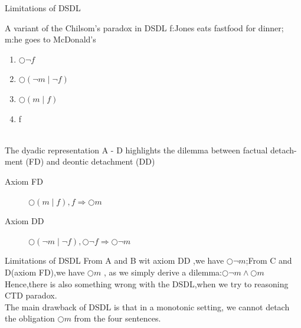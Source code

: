 \documentclass{beamer}
\begin{document}
\begin{frame}{Limitations of DSDL}
\begin{block}{A variant of the Chilsom's paradox in DSDL}
f:Jones eats fastfood for dinner; m:he goes to McDonald’s 
\begin{enumerate}
\item[A]$\bigcirc \neg f$
\item[B]$\bigcirc(\neg m \mid \neg f)$
\item[C]$\bigcirc(m\mid f)$
\item[D]f
\end{enumerate}
\end{block}
\\
The dyadic representation A - D highlights the dilemma between factual detach-ment (FD) and deontic detachment (DD)
\begin{description}
\item[Axiom FD]$\bigcirc(m\mid f),f \Rightarrow \bigcirc m$\\
\item[Axiom DD]$\bigcirc(\neg m \mid \neg f), \bigcirc\neg f \Rightarrow \bigcirc\neg m$\\
\end{description}
\end{frame}
\begin{frame}{Limitations of DSDL}
From A and B wit axiom DD ,we have $\bigcirc\neg  m$;From C and D(axiom FD),we have $\bigcirc m$ , as we simply derive a dilemma:$\bigcirc\neg m\wedge\bigcirc m$\\
Hence,there is also something wrong with the DSDL,when we try to reasoning CTD paradox.\\
The main drawback of DSDL is that in a monotonic setting, we cannot detach
the obligation $\bigcirc m$ from the four sentences.

\end{frame}
\end{document}
